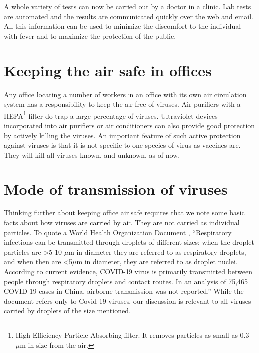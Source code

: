 \begin{multicols}{2}
A whole variety of tests can now be carried out by a doctor in a clinic. Lab tests are automated and the results are communicated quickly over the web and email. All this information can be used to minimize the discomfort to the individual with fever and to maximize the protection of the public. 

\vspace{-.3cm}

\section{Keeping the air safe in offices}\label{section-4}

\vspace{-.2cm}

Any office locating a number of workers in an office with its own air circulation system has a responsibility to keep the air free of viruses. Air purifiers with a HEPA\footnote{High Efficiency Particle Absorbing filter. It removes particles as small as 0.3 $\mu$m in size from the air.} filter do trap a large percentage of viruses. Ultraviolet devices incorporated into air purifiers or air conditioners can also provide good protection by actively killing the viruses. An important feature of such active protection against viruses is that it is not specific to one species of virus as vaccines are. They will kill all viruses known, and unknown, as of now.

\vspace{-.3cm}

\section{Mode of transmission of viruses}\label{section-5}

\vspace{-.2cm}

Thinking further about keeping office air safe requires that we note some basic facts about how viruses are carried by air. They are not carried as individual particles. To quote a World Health Organization Document \cite{art3-key03}, “Respiratory infections can be transmitted through droplets of different sizes: when the droplet particles are >5-10 $\mu$m in diameter they are referred to as respiratory droplets, and when then are <5$\mu$m in diameter, they are referred to as droplet nuclei. According to current evidence, COVID-19 virus is primarily transmitted between people through respiratory droplets and contact routes. In an analysis of 75,465 COVID-19 cases in China, airborne transmission was not reported.” While the document refers only to Covid-19 viruses, our discussion is relevant to all viruses carried by droplets of the size mentioned. 


\end{multicols}
